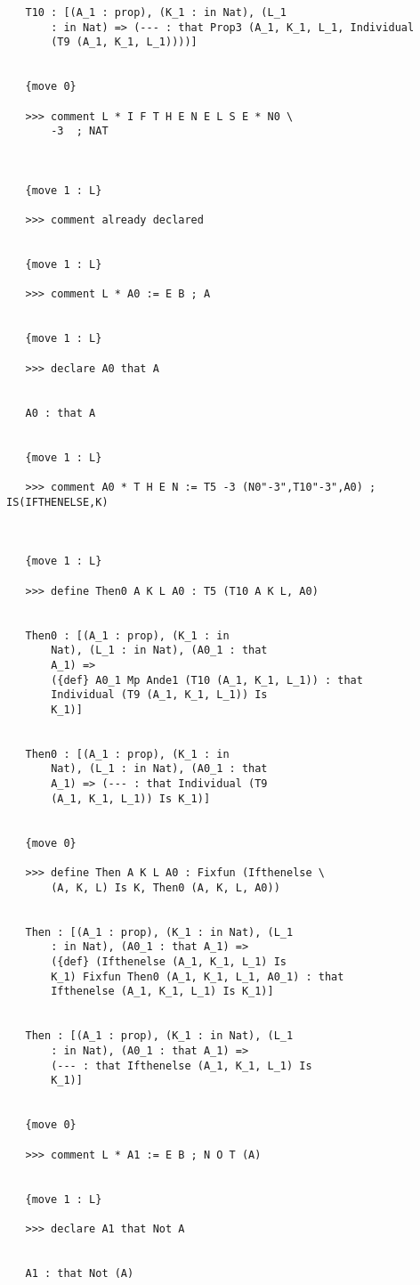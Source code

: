 \documentclass{article}
\begin{document}
\begin{verbatim}
   T10 : [(A_1 : prop), (K_1 : in Nat), (L_1 
       : in Nat) => (--- : that Prop3 (A_1, K_1, L_1, Individual 
       (T9 (A_1, K_1, L_1))))]


   {move 0}

   >>> comment L * I F T H E N E L S E * N0 \
       -3  ; NAT



   {move 1 : L}

   >>> comment already declared


   {move 1 : L}

   >>> comment L * A0 := E B ; A


   {move 1 : L}

   >>> declare A0 that A


   A0 : that A


   {move 1 : L}

   >>> comment A0 * T H E N := T5 -3 (N0"-3",T10"-3",A0) ; IS(IFTHENELSE,K)



   {move 1 : L}

   >>> define Then0 A K L A0 : T5 (T10 A K L, A0)


   Then0 : [(A_1 : prop), (K_1 : in 
       Nat), (L_1 : in Nat), (A0_1 : that 
       A_1) => 
       ({def} A0_1 Mp Ande1 (T10 (A_1, K_1, L_1)) : that 
       Individual (T9 (A_1, K_1, L_1)) Is 
       K_1)]


   Then0 : [(A_1 : prop), (K_1 : in 
       Nat), (L_1 : in Nat), (A0_1 : that 
       A_1) => (--- : that Individual (T9 
       (A_1, K_1, L_1)) Is K_1)]


   {move 0}

   >>> define Then A K L A0 : Fixfun (Ifthenelse \
       (A, K, L) Is K, Then0 (A, K, L, A0))


   Then : [(A_1 : prop), (K_1 : in Nat), (L_1 
       : in Nat), (A0_1 : that A_1) => 
       ({def} (Ifthenelse (A_1, K_1, L_1) Is 
       K_1) Fixfun Then0 (A_1, K_1, L_1, A0_1) : that 
       Ifthenelse (A_1, K_1, L_1) Is K_1)]


   Then : [(A_1 : prop), (K_1 : in Nat), (L_1 
       : in Nat), (A0_1 : that A_1) => 
       (--- : that Ifthenelse (A_1, K_1, L_1) Is 
       K_1)]


   {move 0}

   >>> comment L * A1 := E B ; N O T (A)


   {move 1 : L}

   >>> declare A1 that Not A


   A1 : that Not (A)



\end{verbatim}
\end{document}
